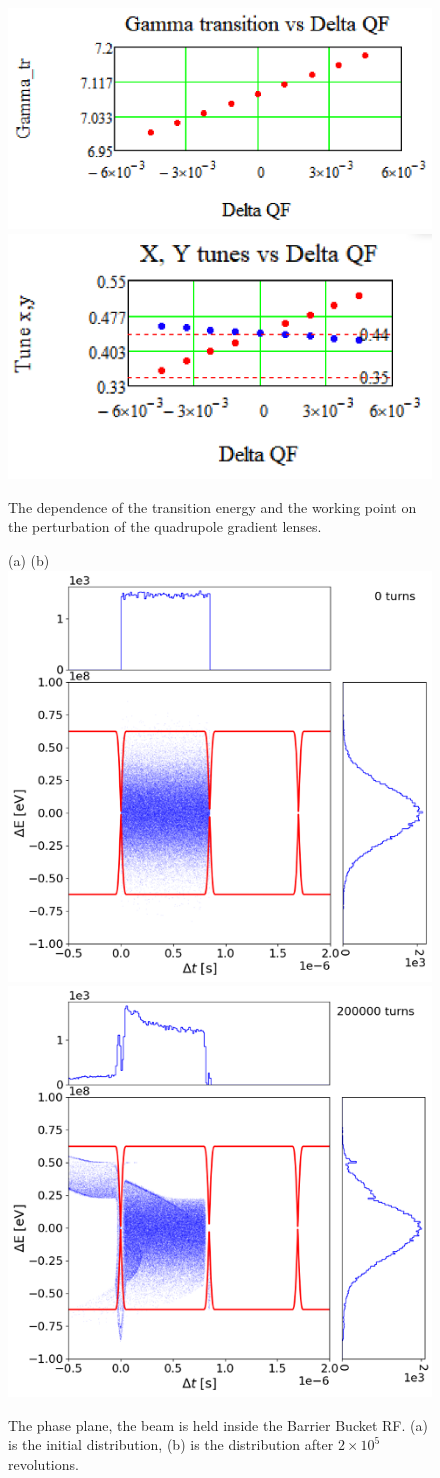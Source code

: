 \documentclass[
aps,%
12pt,%
final,%
notitlepage,%
oneside,%
onecolumn,%
nobibnotes,%
nofootinbib,%
superscriptaddress,%
noshowpacs,%
centertags]%
{revtex4}
\begin{document}
{\begin{figure}[!h]
\setcaptionmargin{5mm}
   \includegraphics*[width=.49\columnwidth]{img/fig_02-1}
   \includegraphics*[width=.49\columnwidth]{img/fig_02-2}
\caption{The dependence of the transition energy and the working point on the perturbation of the quadrupole gradient lenses.}
\label{fig:tran}
\end{figure}

\begin{figure}
\setcaptionmargin{5mm}
	(a) \qquad \qquad \qquad \qquad \qquad \qquad \qquad \qquad \qquad \qquad (b)\\
   \includegraphics*[width=.49\columnwidth]{img/fig_08-1}
   \includegraphics*[width=.49\columnwidth]{img/fig_08-2}
\caption{The phase plane, the beam is held inside the Barrier Bucket RF. (a) is the initial distribution, (b) is the distribution after $2\times{10}^5$ revolutions.}
\label{fig:before}
\end{figure}

}
\end{document}
